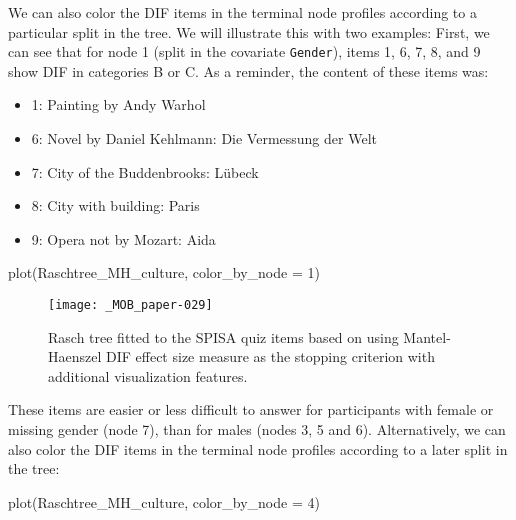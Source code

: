 \documentclass[doc,floatsintext,natbib]{apa7}
\begin{document}
We can also color the DIF items in the terminal node profiles according to a particular split in the tree. We will illustrate this with two examples: First, we can see that for node 1 (split in the covariate \texttt{Gender}), items 1, 6, 7, 8, and 9 show DIF in categories B or C. As a reminder, the content of these items was:

\begin{itemize}
\setlength\itemsep{0em}
\item 1: Painting by Andy Warhol
\item 6: Novel by Daniel Kehlmann: Die Vermessung der Welt
\item 7: City of the Buddenbrooks: Lübeck
\item 8: City with building: Paris
\item 9: Opera not by Mozart: Aida
\end{itemize}

\begin{Schunk}
\begin{Sinput}
 plot(Raschtree_MH_culture, color_by_node = 1)
\end{Sinput}
\end{Schunk}

\begin{figure}%
\caption{Rasch tree fitted to the SPISA quiz items based on using Mantel-Haenszel DIF effect size measure as the stopping criterion with additional visualization features.}
\texttt{[image: \_MOB\_paper-029]}
\label{fig:MHtree3}
\end{figure}%

These items are %
easier or less difficult to answer for participants with female or missing gender (node 7), than for males (nodes 3, 5 and 6). Alternatively, we can also color the DIF items in the terminal node profiles according to a later split in the tree:





\begin{Schunk}
\begin{Sinput}
 plot(Raschtree_MH_culture, color_by_node = 4)
\end{Sinput}
\end{Schunk}
\end{document}
